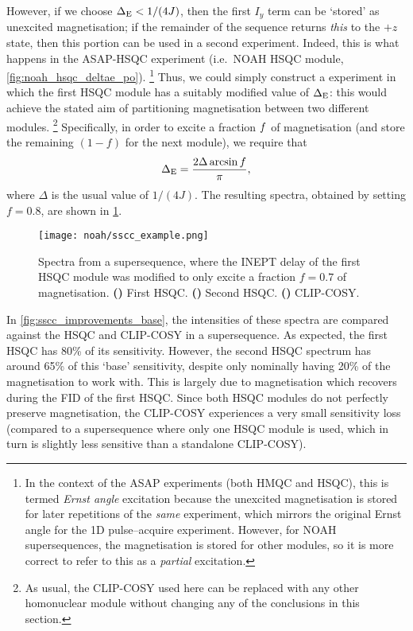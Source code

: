 However, if we choose $\Delta_{\text{E}} < 1/(4J)$, then the first $I_y$ term can be `stored' as unexcited  magnetisation;
if the remainder of the sequence returns \textit{this} to the $+z$ state, then this portion can be used in a second experiment.
Indeed, this is what happens in the ASAP-HSQC experiment (i.e.\ NOAH HSQC module, \cref{fig:noah_hsqc_deltae_po}).%
\footnote{In the context of the ASAP experiments (both HMQC and HSQC), this is termed \textit{Ernst angle} excitation because the unexcited magnetisation is stored for later repetitions of the \textit{same} experiment, which mirrors the original Ernst angle for the 1D pulse--acquire experiment.
However, for NOAH supersequences, the magnetisation is stored for other modules, so it is more correct to refer to this as a \textit{partial} excitation.}
Thus, we could simply construct a  experiment in which the first HSQC module has a suitably modified value of $\Delta_{\text{E}}$: this would achieve the stated aim of partitioning  magnetisation between two different modules.%
\footnote{As usual, the CLIP-COSY used here can be replaced with any other homonuclear module without changing any of the conclusions in this section.}
Specifically, in order to excite a fraction $f\/$ of  magnetisation (and store the remaining $(1 - f)$ for the next module), we require that
\begin{equation}
    \label{eq:ssc_inept_delay}
    \Delta_{\text{E}} = \frac{2\Delta \arcsin f}{\pi},
\end{equation}
where $\Delta$ is the usual value of $1/(4J)$.
The resulting spectra, obtained by setting $f = 0.8$, are shown in \cref{fig:sscc_example}.

\begin{figure}[!ht]
    \centering
    \texttt{[image: noah/sscc\_example.png]}%
    {\label{fig:sscc_example_s1}}%
    {\label{fig:sscc_example_s2}}%
    {\label{fig:sscc_example_cc}}%
    \caption[Spectra from  supersequence]{
        Spectra from a  supersequence, where the INEPT delay of the first HSQC module was modified to only excite a fraction $f = 0.7$ of  magnetisation.
        \textbf{()} First HSQC.
        \textbf{()} Second HSQC.
        \textbf{()} CLIP-COSY.
    }
    \label{fig:sscc_example}
\end{figure}

In \cref{fig:sscc_improvements_base}, the intensities of these spectra are compared against the HSQC and CLIP-COSY in a  supersequence.
As expected, the first HSQC has 80\% of its sensitivity.
However, the second HSQC spectrum has around 65\% of this `base' sensitivity, despite only nominally having 20\% of the  magnetisation to work with.
This is largely due to  magnetisation which recovers during the FID of the first HSQC.
Since both HSQC modules do not perfectly preserve  magnetisation, the CLIP-COSY experiences a very small sensitivity loss (compared to a  supersequence where only one HSQC module is used, which in turn is slightly less sensitive than a standalone CLIP-COSY).


